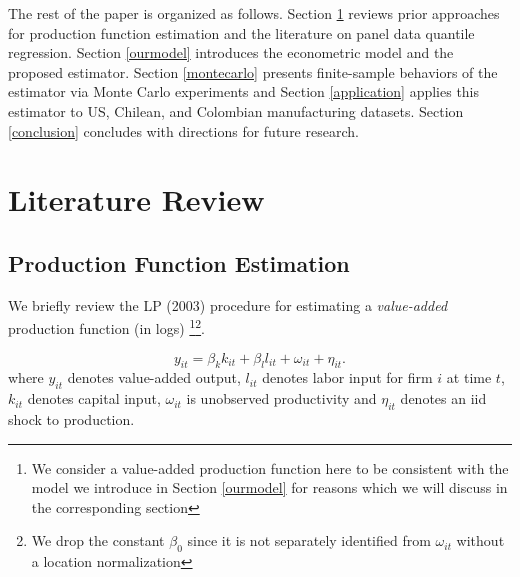 \documentclass[11pt]{article}
\begin{document}
The rest of the paper is organized as follows. Section \ref{litreview} reviews prior approaches for production function estimation and the literature on panel data quantile regression. Section \ref{ourmodel} introduces the econometric model and the proposed estimator. Section \ref{montecarlo} presents finite-sample behaviors of the estimator via Monte Carlo experiments and Section \ref{application} applies this estimator to US, Chilean, and Colombian manufacturing datasets. Section \ref{conclusion} concludes with directions for future research.

\section{Literature Review} \label{litreview}
\subsection{Production Function Estimation}

We briefly review the LP (2003) procedure for estimating a \textit{value-added} production function (in logs) \footnote{We consider a value-added production function here to be consistent with the model we introduce in Section \ref{ourmodel} for reasons which we will discuss in the corresponding section}\footnote{We drop the constant $\beta_{0}$ since it is not separately identified from $\omega_{it}$ without a location normalization}.

\begin{equation}
y_{it}=\beta_{k}k_{it}+\beta_{l}l_{it}+\omega_{it}+\eta_{it}.
\end{equation}
where $y_{it}$ denotes value-added output, $l_{it}$ denotes labor input for firm $i$ at time $t$, $k_{it}$ denotes capital input, $\omega_{it}$ is unobserved productivity and $\eta_{it}$ denotes an iid shock to production.
\end{document}
